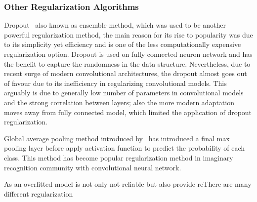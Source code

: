 \subsubsection{Other Regularization Algorithms}

Dropout~\cite{JMLR:v15:srivastava14a} also known as ensemble method, which was used to be another powerful regularization method, the main reason for its rise to popularity was due to its simplicity yet efficiency and is one of the less computationally expensive regularization option. Dropout is used on fully connected neuron network and has the benefit to capture the randomness in the data structure. Nevertheless, due to recent surge of modern convolutional architectures, the dropout almost goes out of favour due to its inefficiency in regularizing convolutional models. This arguably is due to generally low number of parameters in convolutional models and the strong correlation between layers; also the more modern adaptation moves away from fully connected model, which limited the application of dropout regularization. 
\par 
Global average pooling method introduced by~\citet{LinCY13} has introduced a final max pooling layer before apply activation function to predict the probability of each class. This method has become popular regularization method in imaginary recognition community with convolutional neural network. 
\par 
As an overfitted model is not only not reliable but also provide  reThere are many different regularization 